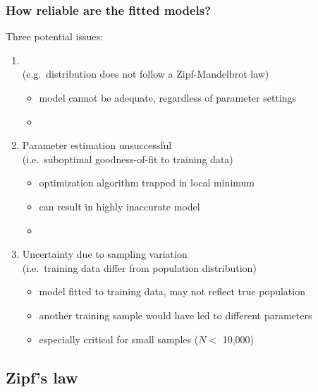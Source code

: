 \documentclass[t]{beamer} %
\begin{document}
\begin{frame}
  \frametitle{How reliable are the fitted models?}
  
  Three potential issues:
  \begin{enumerate}
  \item {}\\
    (e.g.\ distribution does not follow a Zipf-Mandelbrot law)
    \begin{itemize}
    \item[\hand] model cannot be adequate, regardless of parameter settings
    \item[]
    \end{itemize}
  \item Parameter estimation unsuccessful\\
    (i.e.\ suboptimal goodness-of-fit to training data)
    \begin{itemize}
    \item[\hand] optimization algorithm trapped in local minimum
    \item[\hand] can result in highly inaccurate model
    \item[]
    \end{itemize}
  \item Uncertainty due to sampling variation\\
    (i.e.\ training data differ from population distribution)
    \begin{itemize}
    \item[\hand] model fitted to training data, may not reflect true population
    \item[\hand] another training sample would have led to different parameters
    \item[\hand] especially critical for small samples ($N < $ 10,000)
    \end{itemize}
  \end{enumerate}
\end{frame}

\subsection{Zipf's law}
\end{document}
